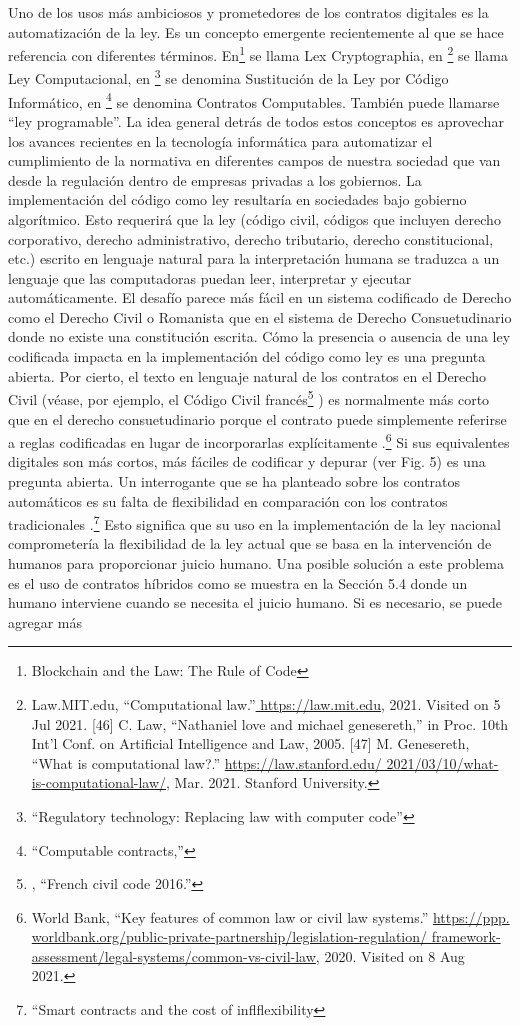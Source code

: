\documentclass[12pt]{report} %
\begin{document}
\begin{itemize}
Uno de los usos más ambiciosos y prometedores de los contratos digitales es   la automatización de la ley. Es un concepto emergente recientemente al que se hace referencia con diferentes términos. En\footnote{\cite{PrimaveraAaron2018}Blockchain and the Law: The Rule of Code}  se llama Lex Cryptographia, en \footnote{Law.MIT.edu, “Computational law.”\url{ https://law.mit.edu}, 2021. Visited on 5 Jul 2021. [46] C. Law, “Nathaniel love and michael genesereth,” in Proc. 10th Int’l Conf. on Artificial Intelligence and Law, 2005. [47] M. Genesereth, “What is computational law?.” \url{https://law.stanford.edu/ 2021/03/10/what-is-computational-law/}, Mar. 2021. Stanford University.} se llama Ley Computacional, en \footnote{\cite{Eva2020}“Regulatory technology: Replacing law with computer code” } se denomina Sustitución de la Ley por Código Informático, en \footnote{\cite{Harry2012}“Computable contracts,” } se denomina Contratos Computables. También puede llamarse “ley programable”. La idea general detrás de todos estos conceptos es aprovechar los avances recientes en la tecnología informática para automatizar el cumplimiento de la normativa en diferentes campos de nuestra sociedad que van desde la regulación dentro de empresas privadas a los gobiernos. La implementación del código como ley resultaría en sociedades bajo gobierno algorítmico. Esto requerirá que la ley (código civil, códigos que incluyen derecho corporativo, derecho administrativo, derecho tributario, derecho constitucional, etc.) escrito en lenguaje natural para la interpretación humana se traduzca a un lenguaje que las computadoras puedan leer, interpretar y ejecutar automáticamente. El desafío parece más fácil en un sistema codificado de Derecho como el Derecho Civil o Romanista que en el sistema de Derecho Consuetudinario donde no existe una constitución escrita. Cómo la presencia o ausencia de una ley codificada impacta en la implementación del código como ley es una pregunta abierta. Por cierto, el texto en lenguaje natural de los contratos en el Derecho Civil (véase, por ejemplo, el Código Civil francés\footnote{\cite{JohnCart2016}, “French civil code 2016.” } ) es normalmente más corto que en el derecho consuetudinario porque el contrato puede simplemente referirse a reglas codificadas en lugar de incorporarlas explícitamente .\footnote{World Bank, “Key features of common law or civil law systems.” \url{https://ppp. worldbank.org/public-private-partnership/legislation-regulation/ framework-assessment/legal-systems/common-vs-civil-law}, 2020. Visited on 8 Aug 2021.} Si sus equivalentes digitales son más cortos, más fáciles de codificar y depurar (ver Fig. 5) es una pregunta abierta. Un interrogante que se ha planteado sobre los contratos automáticos es su falta de flexibilidad en comparación con los contratos tradicionales .\footnote{\cite{JeremySkla2018}“Smart contracts and the cost of inflflexibility} Esto significa que su uso en la implementación de la ley nacional comprometería la flexibilidad de la ley actual que se basa en la intervención de humanos para proporcionar juicio humano. Una posible solución a este problema es el uso de contratos híbridos como se muestra en la Sección 5.4 donde un humano interviene cuando se necesita el juicio humano. Si es necesario, se puede agregar más 
\end{itemize}
\end{document}

